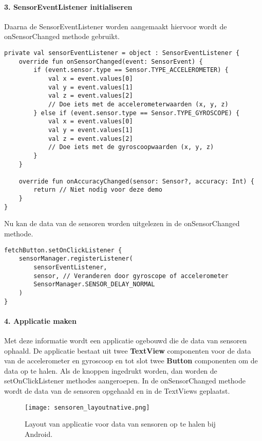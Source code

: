 \paragraph{3. SensorEventListener initialiseren}
Daarna de SensorEventListener worden aangemaakt hiervoor wordt de onSensorChanged methode gebruikt.
\begin{verbatim}
private val sensorEventListener = object : SensorEventListener {
    override fun onSensorChanged(event: SensorEvent) {
        if (event.sensor.type == Sensor.TYPE_ACCELEROMETER) {
            val x = event.values[0]
            val y = event.values[1]
            val z = event.values[2]
            // Doe iets met de accelerometerwaarden (x, y, z)
        } else if (event.sensor.type == Sensor.TYPE_GYROSCOPE) {
            val x = event.values[0]
            val y = event.values[1]
            val z = event.values[2]
            // Doe iets met de gyroscoopwaarden (x, y, z)
        }
    }

    override fun onAccuracyChanged(sensor: Sensor?, accuracy: Int) {
        return // Niet nodig voor deze demo
    }
}
\end{verbatim}
Nu kan de data van de sensoren worden uitgelezen in de onSensorChanged methode.
\begin{verbatim}
fetchButton.setOnClickListener {
    sensorManager.registerListener(
        sensorEventListener,
        sensor, // Veranderen door gyroscope of accelerometer
        SensorManager.SENSOR_DELAY_NORMAL
    )
}
\end{verbatim}

\paragraph{4. Applicatie maken}
Met deze informatie wordt een applicatie ogebouwd die de data van sensoren 
ophaald. De applicatie bestaat uit twee \textbf{TextView} componenten voor de data van de 
accelerometer en gyroscoop en tot slot twee \textbf{Button} componenten om de data op te halen. 
Als de knoppen ingedrukt worden, dan worden de setOnClickListener methodes aangeroepen.
In de onSensorChanged methode wordt de data van de sensoren opgehaald en in de TextViews
geplaatst.
\begin{figure}[H]
    \centering
    \texttt{[image: sensoren\_layoutnative.png]}
    \caption{Layout van applicatie voor data van sensoren op te halen bij Android.}
\end{figure}
